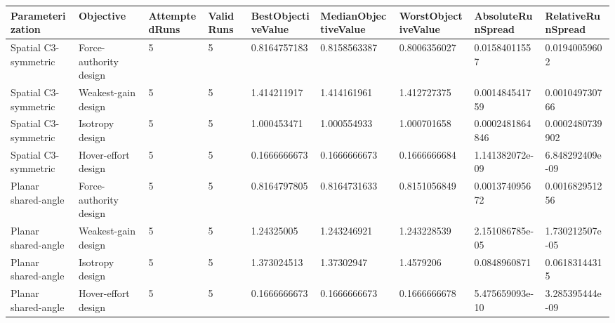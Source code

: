 \begin{tabular}{@{}lllllllll@{}}
\toprule
Parameterization & Objective & AttemptedRuns & ValidRuns & BestObjectiveValue & MedianObjectiveValue & WorstObjectiveValue & AbsoluteRunSpread & RelativeRunSpread \\
\midrule
Spatial C3-symmetric & Force-authority design & 5 & 5 & 0.8164757183 & 0.8158563387 & 0.8006356027 & 0.01584011557 & 0.01940059602 \\
Spatial C3-symmetric & Weakest-gain design & 5 & 5 & 1.414211917 & 1.414161961 & 1.412727375 & 0.001484541759 & 0.001049730766 \\
Spatial C3-symmetric & Isotropy design & 5 & 5 & 1.000453471 & 1.000554933 & 1.000701658 & 0.0002481864846 & 0.0002480739902 \\
Spatial C3-symmetric & Hover-effort design & 5 & 5 & 0.1666666673 & 0.1666666673 & 0.1666666684 & 1.141382072e-09 & 6.848292409e-09 \\
Planar shared-angle & Force-authority design & 5 & 5 & 0.8164797805 & 0.8164731633 & 0.8151056849 & 0.001374095672 & 0.001682951256 \\
Planar shared-angle & Weakest-gain design & 5 & 5 & 1.24325005 & 1.243246921 & 1.243228539 & 2.151086785e-05 & 1.730212507e-05 \\
Planar shared-angle & Isotropy design & 5 & 5 & 1.373024513 & 1.37302947 & 1.4579206 & 0.0848960871 & 0.06183144315 \\
Planar shared-angle & Hover-effort design & 5 & 5 & 0.1666666673 & 0.1666666673 & 0.1666666678 & 5.475659093e-10 & 3.285395444e-09 \\
\bottomrule
\end{tabular}
